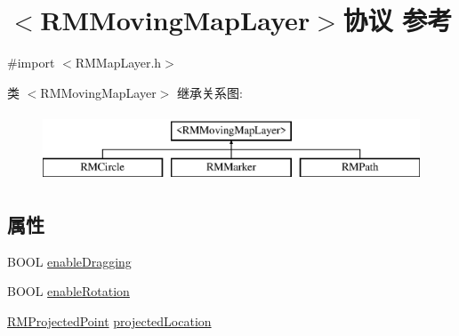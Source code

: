 \hypertarget{protocol_r_m_moving_map_layer-p}{\section{$<$R\-M\-Moving\-Map\-Layer$>$协议 参考}
\label{protocol_r_m_moving_map_layer-p}
}


{\ttfamily \#import $<$R\-M\-Map\-Layer.\-h$>$}

类 $<$R\-M\-Moving\-Map\-Layer$>$ 继承关系图\-:\begin{figure}[H]
\begin{center}
\leavevmode
\includegraphics[height=2.000000cm]{protocol_r_m_moving_map_layer-p}
\end{center}
\end{figure}
\subsection*{属性}
\begin{DoxyCompactItemize}
\item 
B\-O\-O\-L \hyperlink{protocol_r_m_moving_map_layer-p_a5ee0b003170b8e66e2ac6bf4ea8820be}{enable\-Dragging}
\item 
B\-O\-O\-L \hyperlink{protocol_r_m_moving_map_layer-p_ada91bd4f9f5507b894d1534c01727ee9}{enable\-Rotation}
\item 
\hyperlink{struct_r_m_projected_point}{R\-M\-Projected\-Point} \hyperlink{protocol_r_m_moving_map_layer-p_a4a6ac55816966cfafc82a6e5114d2cac}{projected\-Location}
\end{DoxyCompactItemize}


